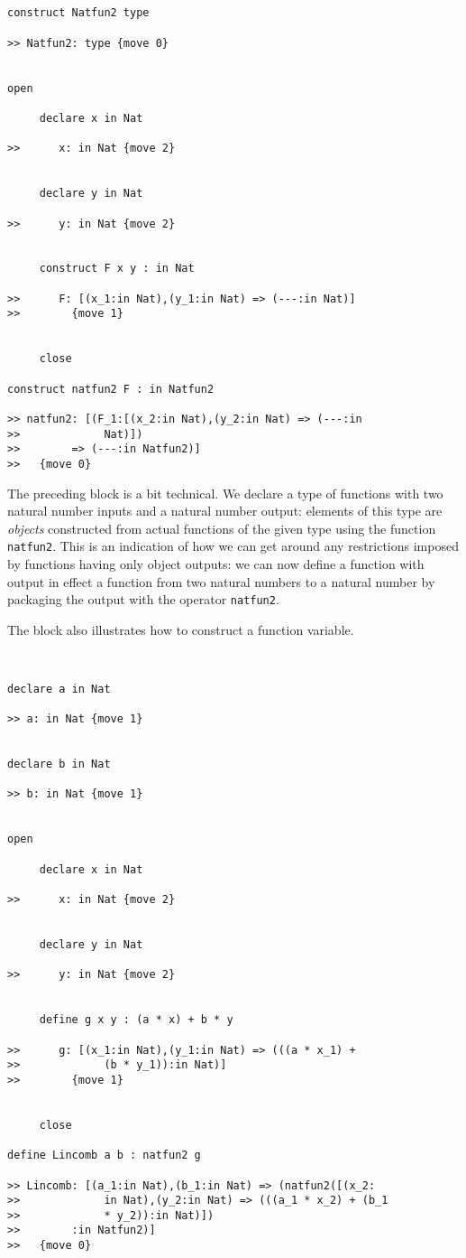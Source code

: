 \documentclass[12pt]{article}
\begin{document}
\begin{verbatim}


construct Natfun2 type

>> Natfun2: type {move 0}


open

     declare x in Nat

>>      x: in Nat {move 2}


     declare y in Nat

>>      y: in Nat {move 2}


     construct F x y : in Nat

>>      F: [(x_1:in Nat),(y_1:in Nat) => (---:in Nat)]
>>        {move 1}


     close

construct natfun2 F : in Natfun2

>> natfun2: [(F_1:[(x_2:in Nat),(y_2:in Nat) => (---:in 
>>             Nat)])
>>        => (---:in Natfun2)]
>>   {move 0}

\end{verbatim}

The preceding block is a bit technical.  We declare a type of functions with two natural number inputs and a natural number output:  elements of this type are {\em objects} constructed from actual functions of the given type using the function {\tt natfun2}.  This is an indication of how we can get around any restrictions imposed by functions having only object outputs: we can now define a function with output in effect a function from two natural numbers to a natural number by packaging the output with the operator {\tt natfun2}.

The block also illustrates how to construct a function variable.

\begin{verbatim}


declare a in Nat

>> a: in Nat {move 1}


declare b in Nat

>> b: in Nat {move 1}


open

     declare x in Nat

>>      x: in Nat {move 2}


     declare y in Nat

>>      y: in Nat {move 2}


     define g x y : (a * x) + b * y

>>      g: [(x_1:in Nat),(y_1:in Nat) => (((a * x_1) + 
>>             (b * y_1)):in Nat)]
>>        {move 1}


     close

define Lincomb a b : natfun2 g

>> Lincomb: [(a_1:in Nat),(b_1:in Nat) => (natfun2([(x_2:
>>             in Nat),(y_2:in Nat) => (((a_1 * x_2) + (b_1 
>>             * y_2)):in Nat)])
>>        :in Natfun2)]
>>   {move 0}

\end{verbatim}
\end{document}
